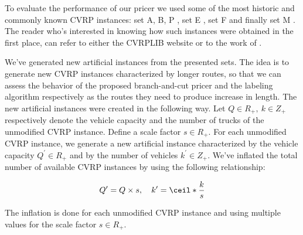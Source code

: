\medskip

To evaluate the performance of our pricer we used some of the most historic
and commonly known
CVRP instances:
set A, B, P \parencite{augerat1995}, set E \parencite{christofides1969},
set F \parencite{fisher1994}
and finally set M \parencite{christofides1979vehicle}.
The reader who's interested in knowing how such instances were obtained in the first
place, can refer to either the CVRPLIB website or to the work of \textcite{uchoa2017}.

\medskip
{}

\medskip

We've generated new artificial instances from the presented sets.
The idea is to generate new CVRP instances characterized by longer routes,
so that we can assess the behavior of the proposed branch-and-cut pricer
and the labeling algorithm respectively as the routes
they need to produce increase in length.
The new artificial instances were created in the following way.
Let $Q \in R_+,\ k \in Z_+$ respectively denote the vehicle
capacity and the number of trucks of the unmodified CVRP instance.
Define a scale factor $s \in R_+$.
For each unmodified CVRP instance, we generate a new artificial instance
characterized by the vehicle capacity $Q^\prime \in R_+$
and by the number of vehicles $k^\prime \in Z_+$.
We've inflated the total number of available CVRP instances
by using the following relationship:

$$
	Q^\prime = Q \times s, \quad k^\prime = \ceil*{\frac{k}{s}}
$$

The inflation is done for each unmodified CVRP instance and using
multiple values for the scale factor $s \in R_+$.

\section{\bapcod}
\label{sec:results-bapcod}

